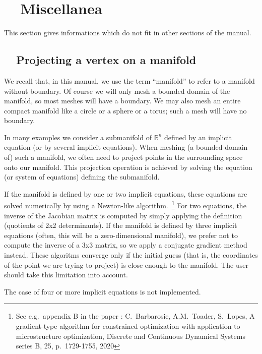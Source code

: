 
\chapter{~~Miscellanea}\label{\numb section 8}

This section gives informations which do not fit in other sections of the manual.


\section{~~Projecting a vertex on a manifold}\label{\numb section 8.\numb parag 1}

We recall that, in this manual, we use the term ``manifold'' to refer to a manifold without boundary.
Of course we will only mesh a bounded domain of the manifold, so most meshes will have a boundary.
We may also mesh an entire compact manifold like a circle or a sphere or a torus;
such a mesh will have no boundary.

In many examples we consider a submanifold of $ \mathbb{R}^n $ defined by an implicit equation
(or by several implicit equations).
When meshing (a bounded domain of) such a manifold, we often need to project points in
the surrounding space onto our manifold.
This projection operation is achieved by solving
the equation (or system of equations) defining the submanifold.

If the manifold is defined by one or two implicit equations,
these equations are solved numerically by using a Newton-like algorithm.$\,$%
\footnote {{} See e.g.\ appendix B in the paper : C.~Barbarosie, A.M.~Toader, S.~Lopes,
A gradient-type algorithm for constrained optimization with application to microstructure optimization,
Discrete and Continuous Dynamical Systems series B, 25, p.\ 1729-1755, 2020}
For two equations, the inverse of the Jacobian matrix is computed by simply applying the definition
(quotients of 2x2 determinants).
If the manifold is defined by three implicit equations (often, this will be a zero-dimensional manifold),
we prefer not to compute the inverse of a 3x3 matrix, so we apply a conjugate gradient method instead.
These algoritms converge only if the initial guess (that is, the coordinates of the point we are
trying to project) is close enough to the manifold.
The user should take this limitation into account.

The case of four or more implicit equations is not implemented.

